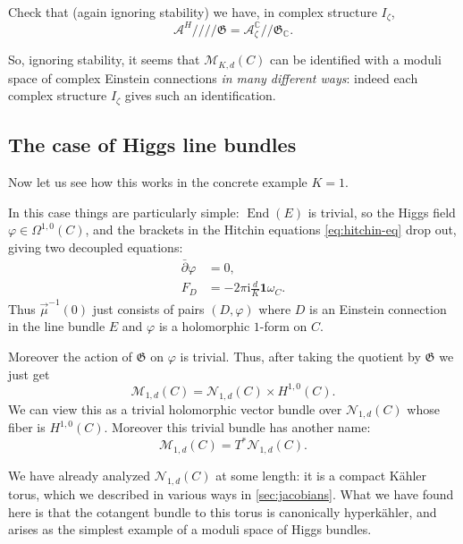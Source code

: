 \documentclass[12pt,letterpaper,reqno]{article}
\numberwithin{equation}{section}
\newcommand{\fG}{{\mathfrak G}}
\newcommand{\cM}{\ensuremath{\mathcal M}}
\newcommand{\cN}{\ensuremath{\mathcal N}}
\newcommand{\cA}{\ensuremath{\mathcal A}}
\newcommand{\C}{\ensuremath{\mathbb C}}
\newcommand{\kahler}{K\"ahler\xspace}
\newcommand{\kq}{/\!\!/}
\newcommand{\hk}{hyperk\"ahler\xspace}
\newcommand{\hkq}{/\!\!/\!\!/\!\!/}
\newcommand{\I}{{\mathrm i}}
\newcommand\bid{{\mathbf 1}}
\newcommand{\ti}[1]{\textit{#1}}
\DeclareMathOperator{\End}{End}
\begin{document}
\begin{exercise}
Check that (again ignoring stability) we have,
in complex structure $I_\zeta$,
\begin{equation}
  \cA^H \hkq \fG = \cA_\zeta^\C \kq \fG_\C.
\end{equation}
\end{exercise}

So, ignoring stability, it seems that $\cM_{K,d}(C)$ can be identified with
a moduli space of complex Einstein connections
\ti{in many different ways}: indeed each
complex structure $I_\zeta$ gives such an identification.


\subsection{The case of Higgs line bundles}

\begin{example}
Now let us see how this works in the concrete example $K=1$.

In this case things are particularly simple: $\End(E)$ is trivial,
so the Higgs field $\varphi \in \Omega^{1,0}(C)$,
and the brackets in the Hitchin equations \eqref{eq:hitchin-eq}
drop out, giving two decoupled equations:
\begin{subequations}
\begin{align}
  \bar\partial \varphi &= 0, \\
  F_D &= - 2\pi \I \frac{d}{K} \bid \omega_C.
\end{align}
\end{subequations}
Thus $\vec\mu^{-1}(0)$ just consists of pairs $(D,\varphi)$
where $D$ is an Einstein connection in
the line bundle $E$ and $\varphi$ is a holomorphic $1$-form on $C$.

Moreover the action of $\fG$ on $\varphi$ is trivial.
Thus, after taking the quotient by $\fG$ we just get
\begin{equation}
  \cM_{1,d}(C) = \cN_{1,d}(C) \times H^{1,0}(C).
\end{equation}
We can view this as a trivial holomorphic vector bundle over $\cN_{1,d}(C)$ whose
fiber is $H^{1,0}(C)$. Moreover this trivial bundle has another name:
\begin{equation}
  \cM_{1,d}(C) = T^* \cN_{1,d}(C).
\end{equation}

We have already analyzed $\cN_{1,d}(C)$ at some length: it is a compact
\kahler torus, which we described in various ways
in \autoref{sec:jacobians}.
What we have found here is that the cotangent bundle
to this torus is canonically \hk, and arises as the
simplest example of a moduli space of Higgs bundles.
\end{example}
\end{document}
